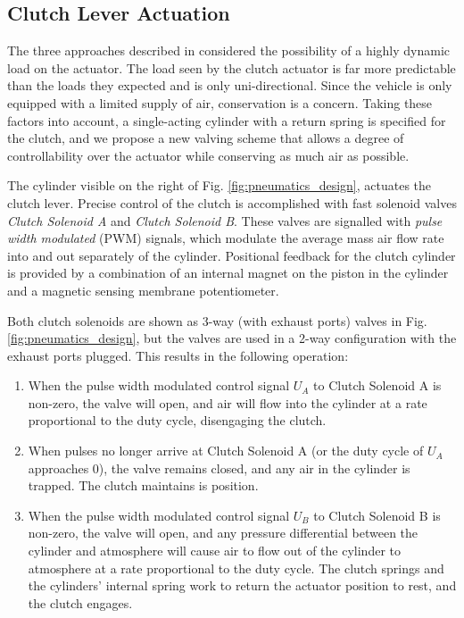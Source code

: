 \subsection{Clutch Lever Actuation}

The three approaches described in \cite{pneumatic_actuator, adaptive_pneumatic, accurate_position} considered the possibility of a highly dynamic load on the actuator. The load seen by the clutch actuator is far more predictable than the loads they expected and is only uni-directional. Since the vehicle is only equipped with a limited supply of air, conservation is a concern. Taking these factors into account, a single-acting cylinder with a return spring is specified for the clutch, and we propose a new valving scheme that allows a degree of controllability over the actuator while conserving as much air as possible.

The cylinder visible on the right of Fig. \ref{fig:pneumatics_design}, actuates the clutch lever. Precise control of the clutch is accomplished with fast solenoid valves \emph{Clutch Solenoid A} and \emph{Clutch Solenoid B}. These valves are signalled with \emph{pulse width modulated} (PWM) signals, which modulate the average mass air flow rate into and out separately of the cylinder. Positional feedback for the clutch cylinder is provided by a combination of an internal magnet on the piston in the cylinder and a magnetic sensing membrane potentiometer.

Both clutch solenoids are shown as 3-way (with exhaust ports) valves in Fig. \ref{fig:pneumatics_design}, but the valves are used in a 2-way configuration with the exhaust ports plugged.  This results in the following operation:

\begin{enumerate}
  \item When the pulse width modulated control signal $U_A$ to Clutch Solenoid A is non-zero, the valve will open, and air will flow into the cylinder at a rate proportional to the duty cycle, disengaging the clutch.
  \item When pulses no longer arrive at Clutch Solenoid A (or the duty cycle of $U_A$ approaches 0), the valve remains closed, and any air in the cylinder is trapped. The clutch maintains is position.
  \item When the pulse width modulated control signal $U_B$ to Clutch Solenoid B is non-zero, the valve will open, and any pressure differential between the cylinder and atmosphere will cause air to flow out of the cylinder to atmosphere at a rate proportional to the duty cycle. The clutch springs and the cylinders' internal spring work to return the actuator position to rest, and the clutch engages.
\end{enumerate}

